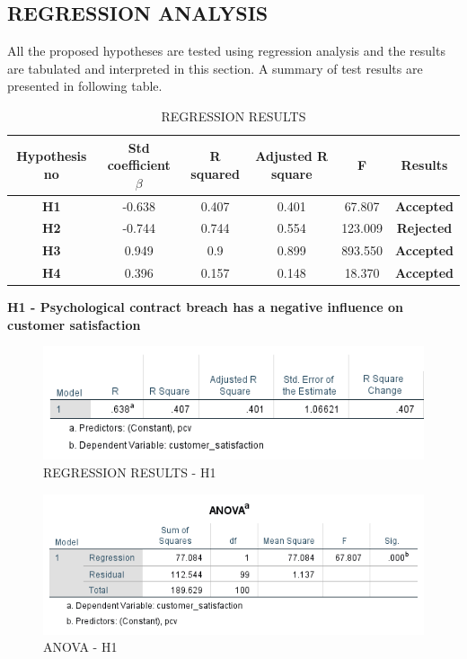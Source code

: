 \documentclass[a4paper, 12pt]{extarticle}
\begin{document}
{\subsection{REGRESSION ANALYSIS}
All the proposed hypotheses are tested using regression analysis and the results are tabulated and interpreted in this section. A summary of test results are presented in following table.

\begin{table}[H]
\centering
\begin{tabular}{|c|c|c|c|c|c|}
\hline
Hypothesis no & Std coefficient $\beta$  & R squared & Adjusted R square & F & Results \\
\hline
\textbf{H1} & -0.638 & 0.407 & 0.401 & 67.807 & \textbf{Accepted} \\
\hline
\textbf{H2} & -0.744 & 0.744 & 0.554 & 123.009 & \textbf{Rejected} \\
\hline
\textbf{H3} & 0.949 & 0.9 & 0.899 & 893.550 & \textbf{Accepted} \\
\hline
\textbf{H4} & 0.396 & 0.157 & 0.148 & 18.370 & \textbf{Accepted} \\
\hline 
\end{tabular}
\caption{REGRESSION RESULTS}
\end{table}
\newpage
\par \textbf{H1 - Psychological contract breach has a negative influence on customer satisfaction}\\
\begin{figure}[H]
\centering
\includegraphics[scale=1]{pcv_vs_customer_satisfaction.png}
\caption{REGRESSION RESULTS - H1}
\end{figure}

\begin{figure}[H]
\centering
\includegraphics[scale=1]{anova_pcv_cs.png}
\caption{ANOVA - H1}
\end{figure}

}
\end{document}
